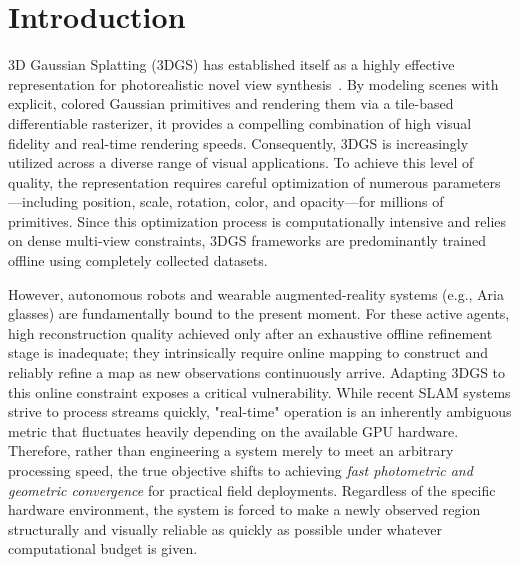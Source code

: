 
\section{Introduction}
\label{sec:intro}
3D Gaussian Splatting (3DGS) has established itself as a highly effective representation for photorealistic novel view synthesis~\cite{kerbl20233dgs}. By modeling scenes with explicit, colored Gaussian primitives and rendering them via a tile-based differentiable rasterizer, it provides a compelling combination of high visual fidelity and real-time rendering speeds. Consequently, 3DGS is increasingly utilized across a diverse range of visual applications. 
To achieve this level of quality, the representation requires careful optimization of numerous parameters—including position, scale, rotation, color, and opacity—for millions of primitives. Since this optimization process is computationally intensive and relies on dense multi-view constraints, 3DGS frameworks are predominantly trained offline using completely collected datasets.

However, autonomous robots and wearable augmented-reality systems (e.g., Aria glasses) are fundamentally bound to the present moment. For these active agents, high reconstruction quality achieved only after an exhaustive offline refinement stage is inadequate; they intrinsically require online mapping to construct and reliably refine a map as new observations continuously arrive. 
Adapting 3DGS to this online constraint exposes a critical vulnerability. While recent SLAM systems strive to process streams quickly, "real-time" operation is an inherently ambiguous metric that fluctuates heavily depending on the available GPU hardware. Therefore, rather than engineering a system merely to meet an arbitrary processing speed, the true objective shifts to achieving \emph{fast photometric and geometric convergence} for practical field deployments. Regardless of the specific hardware environment, the system is forced to make a newly observed region structurally and visually reliable as quickly as possible under whatever computational budget is given.

